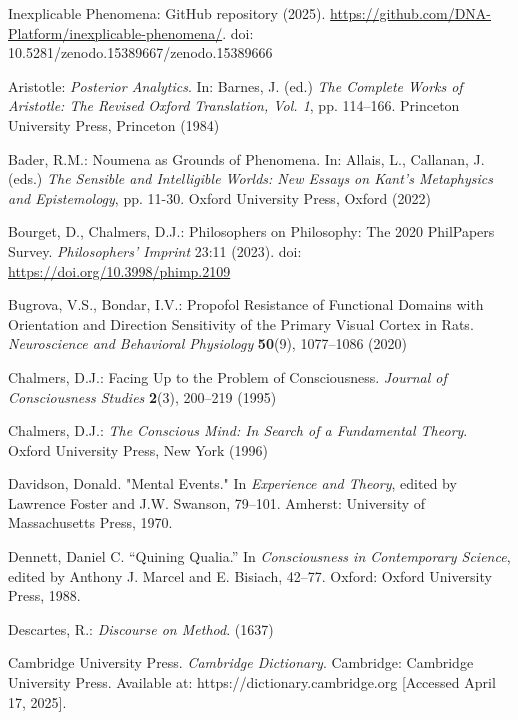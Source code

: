 \documentclass[runningheads]{llncs}
\begin{document}
\begin{thebibliography}{99}

 Inexplicable Phenomena: GitHub repository (2025). \href{https://github.com/DNA-Platform/inexplicable-phenomena/}{https://github.com/DNA-Platform/inexplicable-phenomena/}\xspace. doi: 10.5281/zenodo.15389667/zenodo.15389666 \cite{Formalism}

 Aristotle: \emph{Posterior Analytics}. In: Barnes, J. (ed.) \emph{The Complete Works of Aristotle: The Revised Oxford Translation, Vol. 1}, pp. 114--166. Princeton University Press, Princeton (1984)

 Bader, R.M.: Noumena as Grounds of Phenomena. In: Allais, L., Callanan, J. (eds.) \emph{The Sensible and Intelligible Worlds: New Essays on Kant's Metaphysics and Epistemology}, pp. 11-30. Oxford University Press, Oxford (2022)

 Bourget, D., Chalmers, D.J.: Philosophers on Philosophy: The 2020 PhilPapers Survey. \emph{Philosophers' Imprint} 23:11 (2023). doi: \href{https://doi.org/10.3998/phimp.2109}{https://doi.org/10.3998/phimp.2109}\xspace

 Bugrova, V.S., Bondar, I.V.: Propofol Resistance of Functional Domains with Orientation and Direction Sensitivity of the Primary Visual Cortex in Rats. \emph{Neuroscience and Behavioral Physiology} \textbf{50}(9), 1077--1086 (2020)

 Chalmers, D.J.: Facing Up to the Problem of Consciousness. \emph{Journal of Consciousness Studies} \textbf{2}(3), 200--219 (1995)

 Chalmers, D.J.: \emph{The Conscious Mind: In Search of a Fundamental Theory}. Oxford University Press, New York (1996)

 Davidson, Donald. "Mental Events." In \emph{Experience and Theory}, edited by Lawrence Foster and J.W. Swanson, 79–101. Amherst: University of Massachusetts Press, 1970.

 Dennett, Daniel C. “Quining Qualia.” In \emph{Consciousness in Contemporary Science}, edited by Anthony J. Marcel and E. Bisiach, 42–77. Oxford: Oxford University Press, 1988.

 Descartes, R.: \emph{Discourse on Method}. (1637)

 Cambridge University Press. \emph{Cambridge Dictionary}. Cambridge: Cambridge University Press. Available at: https://dictionary.cambridge.org [Accessed April 17, 2025].


\end{thebibliography}
\end{document}
